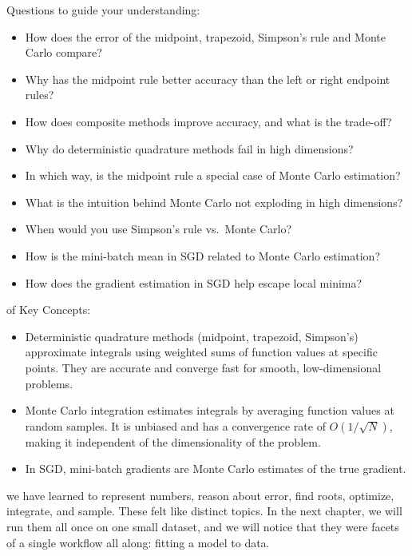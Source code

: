  Questions to guide your understanding:
\begin{itemize}
    \item How does the error of the midpoint, trapezoid, Simpson's rule and Monte Carlo compare?
    \item Why has the midpoint rule better accuracy than the left or right endpoint rules?
    \item How does composite methods improve accuracy, and what is the trade-off?
    \item Why do deterministic quadrature methods fail in high dimensions?
    \item In which way, is the midpoint rule a special case of Monte Carlo estimation?
    \item What is the intuition behind Monte Carlo not exploding in high dimensions?
    \item When would you use Simpson's rule vs.\ Monte Carlo?
    \item How is the mini-batch mean in SGD related to Monte Carlo estimation?
    \item How does the gradient estimation in SGD help escape local minima?
\end{itemize}

 of Key Concepts:
\begin{itemize}
    \item Deterministic quadrature methods (midpoint, trapezoid, Simpson's) approximate integrals using weighted sums of function values at 
    specific points. They are accurate and converge fast for smooth, low-dimensional problems.
    \item Monte Carlo integration estimates integrals by averaging function values at random samples. 
    It is unbiased and has a convergence rate of $O(1/\sqrt{N})$, making it independent of the dimensionality of the problem.
    \item In SGD, mini-batch gradients are Monte Carlo estimates of the true gradient.
\end{itemize}




 we have learned to represent numbers, reason about error,
find roots, optimize, integrate, and sample.
These felt like distinct topics.
In the next chapter, we will run them all once on one small dataset, and we will notice that they were facets of a single workflow all along: fitting a model to data.

